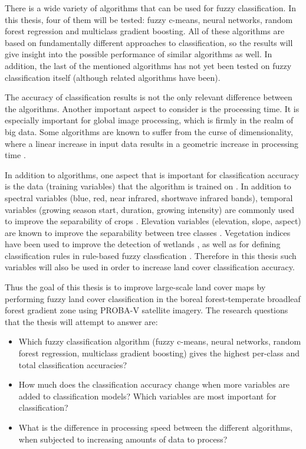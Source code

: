 \documentclass[a4paper,10pt]{book}
\begin{document}
There is a wide variety of algorithms that can be used for fuzzy classification. In this thesis, four of them will be tested: fuzzy c-means, neural networks, random forest regression and multiclass gradient boosting. All of these algorithms are based on fundamentally different approaches to classification, so the results will give insight into the possible performance of similar algorithms as well. In addition, the last of the mentioned algorithms has not yet been tested on fuzzy classification itself (although related algorithms have been).

The accuracy of classification results is not the only relevant difference between the algorithms. Another important aspect to consider is the processing time. It is especially important for global image processing, which is firmly in the realm of big data. Some algorithms are known to suffer from the curse of dimensionality, where a linear increase in input data results in a geometric increase in processing time \citep{walton2008subpixelrf}.

In addition to algorithms, one aspect that is important for classification accuracy is the data (training variables) that the algorithm is trained on \citep{yu2014metadiscoveries}. In addition to spectral variables (blue, red, near infrared, shortwave infrared bands), temporal variables (growing season start, duration, growing intensity) are commonly used to improve the separability of crops \citep{jakubauskas2001harmonic}. Elevation variables (elevation, slope, aspect) are known to improve the separability between tree classes \citep{burrough2001fuzzy}. Vegetation indices have been used to improve the detection of wetlands \citep{sader1995wetlands}, as well as for defining classification rules in rule-based fuzzy classfication \citep{baraldi2006rulebased}. Therefore in this thesis such variables will also be used in order to increase land cover classification accuracy.

Thus the goal of this thesis is to improve large-scale land cover maps by performing fuzzy land cover classification in the boreal forest-temperate broadleaf forest gradient zone using PROBA-V satellite imagery. The research questions that the thesis will attempt to answer are:

\begin{itemize}
 \item Which fuzzy classification algorithm (fuzzy c-means, neural networks, random forest regression, multiclass gradient boosting) gives the highest per-class and total classification accuracies?
 \item How much does the classification accuracy change when more variables are added to classification models? Which variables are most important for classification?
 \item What is the difference in processing speed between the different algorithms, when subjected to increasing amounts of data to process?
\end{itemize}
\end{document}
